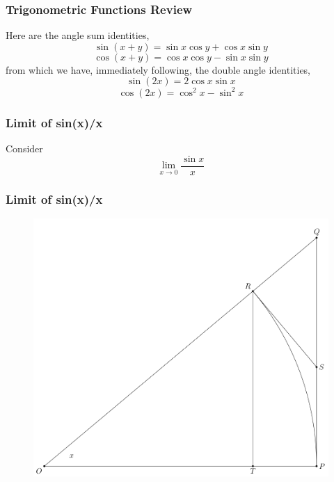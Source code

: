 \documentclass[xcolor=dvipsnames]{beamer}
\begin{document}
\begin{frame}
  \frametitle{Trigonometric Functions Review}
  Here are the angle sum identities,
  \begin{equation}
  \label{eq:eitaiquu}
  \sin(x+y)=\sin{}x\cos{}y+\cos{}x\sin{}y
\end{equation}
\begin{equation}
  \label{eq:iasoojou}
  \cos(x+y)=\cos{}x\cos{}y-\sin{}x\sin{}y
\end{equation}
from which we have, immediately following, the double angle
identities,
  \begin{equation}
    \label{eq:icuchodo}
    \sin(2x)=2\cos{}x\sin{}x
  \end{equation}
  \begin{equation}
    \label{eq:woojahtu}
    \cos(2x)=\cos^{2}x-\sin^{2}x
  \end{equation}
\end{frame}

\begin{frame}
  \frametitle{Limit of sin(x)/x}
  Consider
\begin{equation}
  \label{eq:iepichae}
  \lim_{x\rightarrow{}0}\frac{\sin{}x}{x}
\end{equation}
\end{frame}

\begin{frame}
  \frametitle{Limit of sin(x)/x}
\begin{figure}[h]
\includegraphics[scale=.24]{./diagrams/limsinxoverx.png}
\end{figure}
\end{frame}
\end{document}
